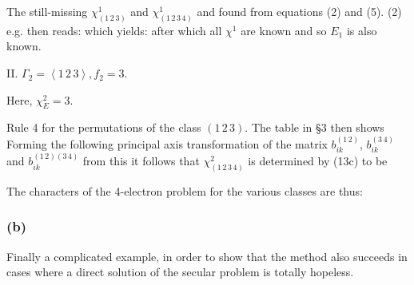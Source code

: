 \begin{paper}{1}
The still-missing $\chi_{(1\,2\,3)}^1$ and $\chi_{(1\,2\,3\,4)}^1$ and found from equations (2) and (5). (2) e.g. then reads:
which yields:
after which all $\chi^1$ are known and so $E_1$ is also known.

II. $\Gamma_2 = \left<1\,2\,3\right>, f_2=3$.

Here, $\chi_E^2=3$.

Rule 4  for the permutations of the class $(1\,2\,3)$. The table in \S3 then shows
Forming the following principal axis transformation of the matrix $b_{ik}^{(1\,2)}$, $b_{ik}^{(3\,4)}$ and $b_{ik}^{(1\,2)(3\,4)}$
from this it follows that
$\chi_{(1\,2\,3\,4)}^2$ is determined by (13c) to be

The characters of the 4-electron problem for the various classes are thus:

\subsubsection*{(b)} Finally a complicated example, in order to show that the method also succeeds in cases where a direct solution of the secular problem is totally hopeless.


\end{paper}

